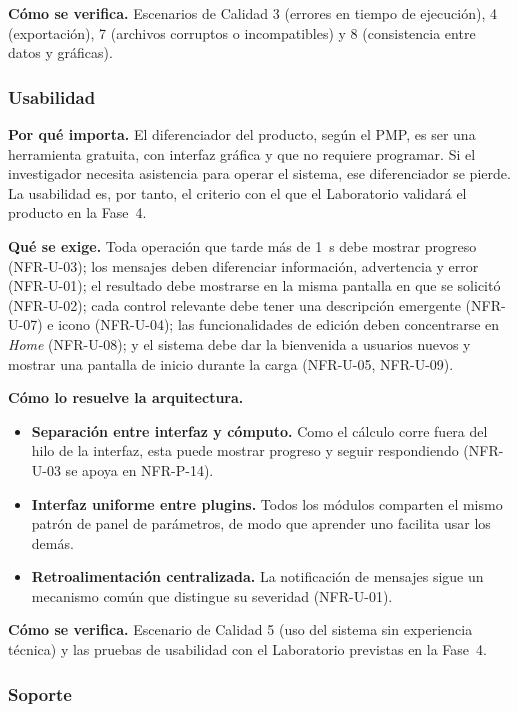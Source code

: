 \documentclass[11pt,a4paper]{article}
\DeclareRobustCommand{\_}{\textunderscore\allowbreak}
\begin{document}
\textbf{Cómo se verifica.} Escenarios de Calidad 3 (errores en tiempo de ejecución), 4 (exportación), 7 (archivos corruptos o incompatibles) y 8 (consistencia entre datos y gráficas).

\subsubsection{Usabilidad}

\textbf{Por qué importa.} El diferenciador del producto, según el PMP, es ser una herramienta gratuita, con interfaz gráfica y que no requiere programar. Si el investigador necesita asistencia para operar el sistema, ese diferenciador se pierde. La usabilidad es, por tanto, el criterio con el que el Laboratorio validará el producto en la Fase~4.

\textbf{Qué se exige.} Toda operación que tarde más de 1~s debe mostrar progreso (NFR-U-03); los mensajes deben diferenciar información, advertencia y error (NFR-U-01); el resultado debe mostrarse en la misma pantalla en que se solicitó (NFR-U-02); cada control relevante debe tener una descripción emergente (NFR-U-07) e icono (NFR-U-04); las funcionalidades de edición deben concentrarse en \textit{Home} (NFR-U-08); y el sistema debe dar la bienvenida a usuarios nuevos y mostrar una pantalla de inicio durante la carga (NFR-U-05, NFR-U-09).

\textbf{Cómo lo resuelve la arquitectura.}
\begin{itemize}[nosep]
    \item \textbf{Separación entre interfaz y cómputo.} Como el cálculo corre fuera del hilo de la interfaz, esta puede mostrar progreso y seguir respondiendo (NFR-U-03 se apoya en NFR-P-14).
    \item \textbf{Interfaz uniforme entre plugins.} Todos los módulos comparten el mismo patrón de panel de parámetros, de modo que aprender uno facilita usar los demás.
    \item \textbf{Retroalimentación centralizada.} La notificación de mensajes sigue un mecanismo común que distingue su severidad (NFR-U-01).
\end{itemize}

\textbf{Cómo se verifica.} Escenario de Calidad 5 (uso del sistema sin experiencia técnica) y las pruebas de usabilidad con el Laboratorio previstas en la Fase~4.

\subsubsection{Soporte}
\end{document}
